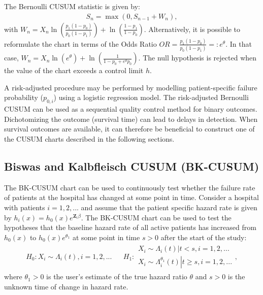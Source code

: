 The Bernoulli CUSUM statistic is given by:
\begin{align}
S_n = \max \left( 0, S_{n-1} + W_n   \right),
\label{eq:BernoulliStatistic}
\end{align}
with \(W_n = X_n \ln \left( \frac{p_1(1-p_0)}{p_0(1-p_1)} \right) + \ln \left( \frac{1-p_1}{1-p_0} \right)\). Alternatively, it is possible to reformulate the chart in terms of the Odds Ratio \(OR = \frac{p_1(1-p_0)}{p_0(1-p_1)} =: e^\theta\). In that case, \(W_n = X_n \ln \left( e^\theta \right) + \ln \left( \frac{1}{1-p_0 + e^\theta p_0} \right)\). The null hypothesis is rejected when the value of the chart exceeds a control limit \(h\).

A risk-adjusted procedure may be performed by modelling patient-specific failure probability (\(p_{0,i}\)) using a logistic regression model. The risk-adjusted Bernoulli CUSUM can be used as a sequential quality control method for binary outcomes. Dichotomizing the outcome (survival time) can lead to delays in detection. When survival outcomes are available, it can therefore be beneficial to construct one of the CUSUM charts described in the following sections.

\hypertarget{sec:BKKCUSUM}{%
\subsection{Biswas and Kalbfleisch CUSUM (BK-CUSUM)}\label{sec:BKKCUSUM}}

The BK-CUSUM chart can be used to continuously test whether the failure rate of patients at the hospital has changed at some point in time. Consider a hospital with patients \(i = 1,2, ...\) and assume that the patient specific hazard rate is given by \(h_i(x) = h_0(x) e^{\mathbf{Z}_i \beta}\). The BK-CUSUM chart can be used to test the hypotheses that the baseline hazard rate of all active patients has increased from \(h_0(x)\) to \(h_0(x) e^{\theta_1}\) at some point in time \(s > 0\) after the start of the study:
\begin{equation}
\begin{aligned}
H_0: X_i \sim \Lambda_i(t), i = 1,2,...  & &H_1: 
\begin{array}{l}
X_i \sim \left. \Lambda_i(t) \right| t < s , i = 1, 2, ... \\
X_i \sim \left. \Lambda_i^{\theta_1}(t) \right| t \geq s, i = 1, 2, ... 
\end{array},
\end{aligned}
\label{eq:BKhypotheses}
\end{equation}
where \(\theta_1 > 0\) is the user's estimate of the true hazard ratio \(\theta\) and \(s > 0\) is the unknown time of change in hazard rate.

